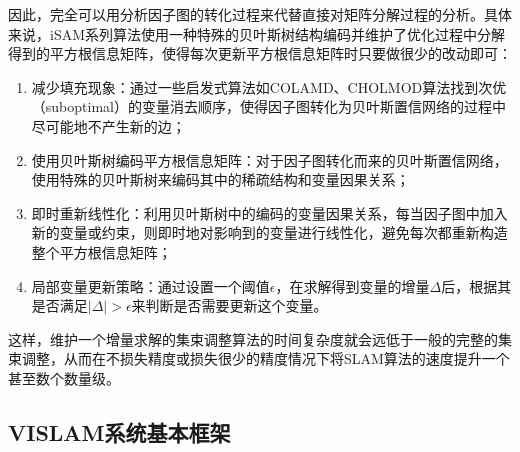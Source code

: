 因此，完全可以用分析因子图的转化过程来代替直接对矩阵分解过程的分析。具体来说，iSAM系列算法使用一种特殊的贝叶斯树结构编码并维护了优化过程中分解得到的平方根信息矩阵，使得每次更新平方根信息矩阵时只要做很少的改动即可：
\begin{enumerate}
    \item 减少填充现象：通过一些启发式算法如COLAMD\citep{davis2004algorithm}、CHOLMOD\citep{chen2008algorithm}算法找到次优（suboptimal）的变量消去顺序，使得因子图转化为贝叶斯置信网络的过程中尽可能地不产生新的边；
    \item 使用贝叶斯树编码平方根信息矩阵：对于因子图转化而来的贝叶斯置信网络，使用特殊的贝叶斯树来编码其中的稀疏结构和变量因果关系；
    \item 即时重新线性化：利用贝叶斯树中的编码的变量因果关系，每当因子图中加入新的变量或约束，则即时地对影响到的变量进行线性化，避免每次都重新构造整个平方根信息矩阵；
    \item 局部变量更新策略：通过设置一个阈值$\epsilon$，在求解得到变量的增量$\Delta$后，根据其是否满足$|\Delta|>\epsilon$来判断是否需要更新这个变量。
\end{enumerate}

这样，维护一个增量求解的集束调整算法的时间复杂度就会远低于一般的完整的集束调整，从而在不损失精度或损失很少的精度情况下将SLAM算法的速度提升一个甚至数个数量级。

\subsection{VISLAM系统基本框架}

